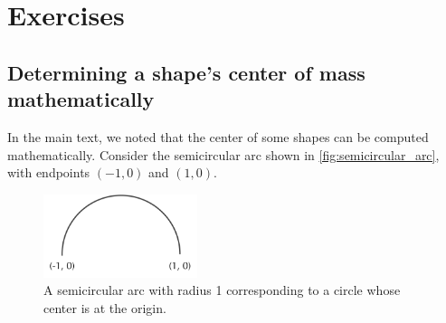 \newpage

\FloatBarrier
\section{Exercises}
\label{sec:coronavirus_exercises}

\subsection{Determining a shape's center of mass mathematically}

In the main text, we noted that the center of some shapes can be computed mathematically. Consider the semicircular arc shown in \autoref{fig:semicircular_arc}, with endpoints $(-1, 0)$ and $(1, 0)$.\\


\begin{figure}[h]
	\centering
	\mySfFamily
	\includegraphics[width = 0.4\textwidth]{../images/semicircular_arc.png}
	\caption{A semicircular arc with radius 1 corresponding to a circle whose center is at the origin.}
	\label{fig:semicircular_arc}
\end{figure}

\begin{exercise}\end{exercise}

\begin{exercise}\end{exercise}

